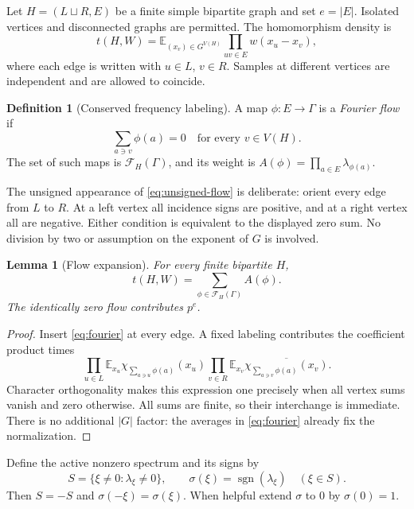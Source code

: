 \documentclass[11pt]{article}
\numberwithin{equation}{section}
\newtheorem{lemma}[theorem]{Lemma}
\theoremstyle{definition}
\newtheorem{definition}[theorem]{Definition}
\theoremstyle{remark}
\newcommand{\E}{\mathbb E}
\newcommand{\sgn}{\operatorname{sgn}}
\newcommand{\Fl}{\mathcal F}
\begin{document}
Let $H=(L\sqcup R,E)$ be a finite simple bipartite graph and set $e=|E|$.
Isolated vertices and disconnected graphs are permitted. The
homomorphism density is
\begin{equation}
 t(H,W)=\E_{(x_v)\in G^{V(H)}}
          \prod_{uv\in E}w(x_u-x_v),
 \label{eq:density}
\end{equation}
where each edge is written with $u\in L$, $v\in R$. Samples at different
vertices are independent and are allowed to coincide.

\begin{definition}[Conserved frequency labeling]
A map $\phi:E\to\Gamma$ is a \emph{Fourier flow} if
\begin{equation}
 \sum_{a\ni v}\phi(a)=0\quad\text{for every }v\in V(H).
 \label{eq:unsigned-flow}
\end{equation}
The set of such maps is $\Fl_H(\Gamma)$, and its weight is
$A(\phi)=\prod_{a\in E}\lambda_{\phi(a)}$.
\end{definition}

The unsigned appearance of \eqref{eq:unsigned-flow} is deliberate:
orient every edge from $L$ to $R$. At a left vertex all incidence signs
are positive, and at a right vertex all are negative. Either condition
is equivalent to the displayed zero sum. No division by two or assumption
on the exponent of $G$ is involved.

\begin{lemma}[Flow expansion]
\label{lem:flow}
For every finite bipartite $H$,
\begin{equation}
 t(H,W)=\sum_{\phi\in\Fl_H(\Gamma)} A(\phi).
 \label{eq:flow-expansion}
\end{equation}
The identically zero flow contributes $p^e$.
\end{lemma}
\begin{proof}
Insert \eqref{eq:fourier} at every edge. A fixed labeling contributes the
coefficient product times
\[
 \prod_{u\in L}\E_{x_u}\chi_{\sum_{a\ni u}\phi(a)}(x_u)
 \prod_{v\in R}\E_{x_v}\overline{
       \chi_{\sum_{a\ni v}\phi(a)}(x_v)}.
\]
Character orthogonality makes this expression one precisely when all
vertex sums vanish and zero otherwise. All sums are finite, so their
interchange is immediate. There is no additional $|G|$ factor: the
averages in \eqref{eq:fourier} already fix the normalization.
\end{proof}

Define the active nonzero spectrum and its signs by
\begin{equation}
 S=\{\xi\ne0:\lambda_\xi\ne0\},\qquad
 \sigma(\xi)=\sgn(\lambda_\xi)\quad(\xi\in S).
 \label{eq:spectrum}
\end{equation}
Then $S=-S$ and $\sigma(-\xi)=\sigma(\xi)$. When helpful extend
$\sigma$ to $0$ by $\sigma(0)=1$.
\end{document}
